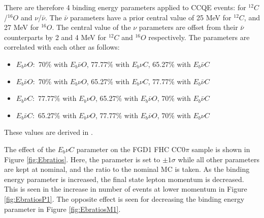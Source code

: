 There are therefore 4 binding energy parameters applied to CCQE events: for $^{12}C$/$^{16}O$ and $\nu$/$\bar{\nu}$. The $\bar{\nu}$ parameters have a prior central value of 25 MeV for $^{12}C$, and 27 MeV for $^{16}O$. The central value of the $\nu$ parameters are offset from their $\bar{\nu}$ counterparts by 2 and 4 MeV for $^{12}C$ and $^{16}O$ respectively. The parameters are correlated with each other as follows:

\begin{itemize}

\item \textbf{$E_{b}\nu O:$} 70$\%$ with $E_{b}\bar{\nu}O$, 77.77$\%$ with $E_{b}\nu C$, 65.27$\%$ with $E_{b}\bar{\nu}C$

\item \textbf{$E_{b}\bar{\nu}O:$} 70$\%$ with $E_{b}\nu O$, 65.27$\%$ with $E_{b}\nu C$, 77.77$\%$ with $E_{b}\bar{\nu}C$

\item \textbf{$E_{b}\nu C:$} 77.77$\%$ with $E_{b}\nu O$, 65.27$\%$ with $E_{b}\bar{\nu}O$, 70$\%$ with $E_{b}\bar{\nu}C$

\item \textbf{$E_{b}\bar{\nu}C:$} 65.27$\%$ with $E_{b}\nu O$, 77.77$\%$ with $E_{b}\bar{\nu}O$, 70$\%$ with $E_{b}\nu C$

\end{itemize}

These values are derived in \cite{tn344}.

The effect of the $E_b \nu C$ parameter on the FGD1 FHC CC0$\pi$ sample is shown in Figure \ref{fig:Ebratios}. Here, the parameter is set to $\pm1\sigma$ while all other parameters are kept at nominal, and the ratio to the nominal MC is taken. As the binding energy parameter is increased, the final state lepton momentum is decreased. This is seen in the increase in number of events at lower momentum in Figure \ref{fig:EbratiosP1}. The opposite effect is seen for decreasing the binding energy parameter in Figure \ref{fig:EbratiosM1}.


